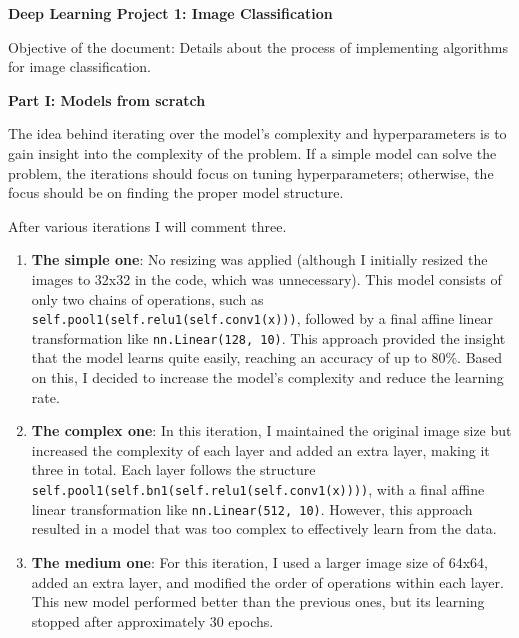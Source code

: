 \documentclass{cpsc202}
\begin{document}
    \centerline{\Large\textbf{Deep Learning Project 1: Image Classification}}

    Objective of the document: Details about the process of implementing algorithms for image classification.

    \large\textbf{Part I: Models from scratch}

    The idea behind iterating over the model's complexity and hyperparameters is to gain insight into the complexity of the problem.
    If a simple model can solve the problem, the iterations should focus on tuning hyperparameters; otherwise, the focus should be on finding the proper model structure.

    After various iterations I will comment three.
    \begin{enumerate}
        \item \textbf{The simple one}: No resizing was applied (although I initially resized the images to 32x32 in the code, which was unnecessary).
        This model consists of only two chains of operations, such as \lstinline|self.pool1(self.relu1(self.conv1(x)))|, followed by a final affine linear transformation like \lstinline|nn.Linear(128, 10)|.
        This approach provided the insight that the model learns quite easily, reaching an accuracy of up to 80\%.
        Based on this, I decided to increase the model's complexity and reduce the learning rate.

        \item \textbf{The complex one}: In this iteration, I maintained the original image size but increased the complexity of each layer and added an extra layer, making it three in total.
        Each layer follows the structure \lstinline|self.pool1(self.bn1(self.relu1(self.conv1(x))))|, with a final affine linear transformation like \lstinline|nn.Linear(512, 10)|.
        However, this approach resulted in a model that was too complex to effectively learn from the data.

        \item \textbf{The medium one}: For this iteration, I used a larger image size of 64x64, added an extra layer, and modified the order of operations within each layer.
        This new model performed better than the previous ones, but its learning stopped after approximately 30 epochs.
    \end{enumerate}
\end{document}
